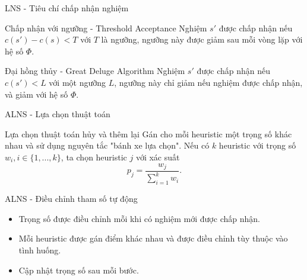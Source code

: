 \begin{frame}{LNS - Tiêu chí chấp nhận nghiệm}
  \begin{block}{Chấp nhận với ngưỡng - Threshold Acceptance}
    Nghiệm $s'$ được chấp nhận nếu $c(s') - c(s) < T$ với $T$ là ngưỡng, ngưỡng này được giảm sau mỗi vòng lặp với hệ số $\Phi$.
  \end{block}
  
  \begin{block}{Đại hồng thủy - Great Deluge Algorithm}
    Nghiệm $s'$ được chấp nhận nếu $c(s') < L$ với một ngưỡng $L$, ngưỡng này chỉ giảm nếu nghiệm được chấp nhận, và giảm với hệ số $\Phi$.
  \end{block}
\end{frame}


\begin{frame}{ALNS - Lựa chọn thuật toán}
  \begin{block}{Lựa chọn thuật toán hủy và thêm lại}
    Gán cho mỗi heuristic một trọng số khác nhau và sử dụng nguyên tắc "bánh xe lựa chọn". Nếu có $k$ heuristic với trọng số $w_i, i \in \{1,...,k\}$, ta chọn heuristic $j$ với xác suất
    \begin{equation}
      \label{eq:select}
      p_j = \frac{w_j}{\sum_{i=1}^k w_i}.
    \end{equation}
  \end{block}
\end{frame}

\begin{frame}{ALNS - Điều chỉnh tham số tự động}
  \begin{itemize}
    \item Trọng số được điều chỉnh mỗi khi có nghiệm mới được chấp nhận.
    \item Mỗi heuristic được gán điểm khác nhau và được điều chỉnh tùy thuộc vào tình huống.
    \item Cập nhật trọng số sau mỗi bước.
  \end{itemize}
\end{frame}

